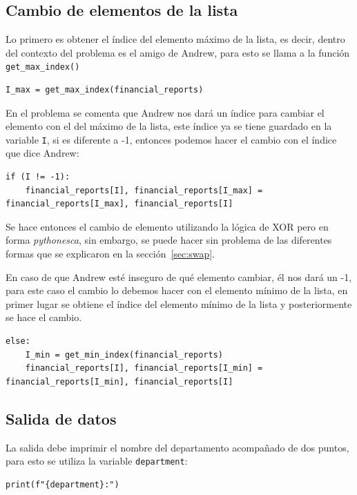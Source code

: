 \documentclass{article}
\begin{document}
\subsection{Cambio de elementos de la lista}

Lo primero es obtener el índice del elemento máximo de la lista, es decir, dentro del contexto del problema es el amigo de Andrew, para esto se llama a la función \lstinline[style=pythonstyle]|get_max_index()| 

\begin{lstlisting}[style=pythonstyle]
I_max = get_max_index(financial_reports)
\end{lstlisting}

En el problema se comenta que Andrew nos dará un índice para cambiar el elemento con el del máximo de la lista, este índice ya se tiene guardado en la variable \texttt{I}, si es diferente a -1, entonces podemos hacer el cambio con el índice que dice Andrew:

\begin{lstlisting}[style=pythonstyle]
if (I != -1):
    financial_reports[I], financial_reports[I_max] = financial_reports[I_max], financial_reports[I]
\end{lstlisting}

Se hace entonces el cambio de elemento utilizando la lógica de XOR pero en forma \textit{pythonesca}, sin embargo, se puede hacer sin problema de las diferentes formas que se explicaron en la sección~\ref{sec:swap}.

En caso de que Andrew esté inseguro de qué elemento cambiar, él nos dará un -1, para este caso el cambio lo debemos hacer con el elemento mínimo de la lista, en primer lugar se obtiene el índice del elemento mínimo de la lista y posteriormente se hace el cambio. 

\begin{lstlisting}[style=pythonstyle]
else:
    I_min = get_min_index(financial_reports)
    financial_reports[I], financial_reports[I_min] = financial_reports[I_min], financial_reports[I]
\end{lstlisting}

\subsection{Salida de datos}

La salida debe imprimir el nombre del departamento acompañado de dos puntos, para esto se utiliza la variable \texttt{department}:

\begin{lstlisting}[style=pythonstyle]
print(f"{department}:")
\end{lstlisting}
\end{document}
